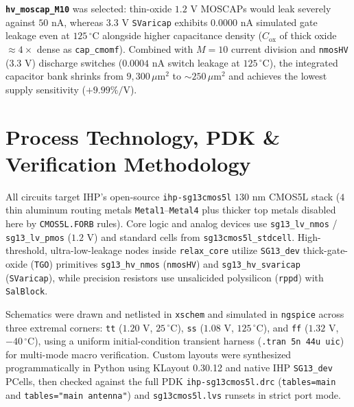 \documentclass[10pt,a4paper]{article}
\begin{document}
\textbf{\texttt{hv\_moscap\_M10}} was selected: thin-oxide $1.2\text{ V}$ MOSCAPs would leak severely against $50\text{ nA}$, whereas $3.3\text{ V}$ \texttt{SVaricap} exhibits $0.0000\text{ nA}$ simulated gate leakage even at $125\,^\circ\text{C}$ alongside higher capacitance density ($C_{\text{ox}}$ of thick oxide $\approx 4\times$ dense as \texttt{cap\_cmomf}). Combined with $M=10$ current division and \texttt{nmosHV} ($3.3\text{ V}$) discharge switches ($0.0004\text{ nA}$ switch leakage at $125\,^\circ\text{C}$), the integrated capacitor bank shrinks from $9{,}300\,\mu\text{m}^2$ to $\sim 250\,\mu\text{m}^2$ and achieves the lowest supply sensitivity ($+9.99\%/\text{V}$).

\section{Process Technology, PDK \& Verification Methodology}

All circuits target IHP's open-source \texttt{ihp-sg13cmos5l} $130\text{ nm}$ CMOS5L stack ($4$ thin aluminum routing metals \texttt{Metal1}--\texttt{Metal4} plus thicker top metals disabled here by \texttt{CMOS5L.FORB} rules). Core logic and analog devices use \texttt{sg13\_lv\_nmos} / \texttt{sg13\_lv\_pmos} ($1.2\text{ V}$) and standard cells from \texttt{sg13cmos5l\_stdcell}. High-threshold, ultra-low-leakage nodes inside \texttt{relax\_core} utilize \texttt{SG13\_dev} thick-gate-oxide (\texttt{TGO}) primitives \texttt{sg13\_hv\_nmos} (\texttt{nmosHV}) and \texttt{sg13\_hv\_svaricap} (\texttt{SVaricap}), while precision resistors use unsalicided polysilicon (\texttt{rppd}) with \texttt{SalBlock}.

Schematics were drawn and netlisted in \texttt{xschem} and simulated in \texttt{ngspice} across three extremal corners: \texttt{tt} ($1.20\text{ V}$, $25\,^\circ\text{C}$), \texttt{ss} ($1.08\text{ V}$, $125\,^\circ\text{C}$), and \texttt{ff} ($1.32\text{ V}$, $-40\,^\circ\text{C}$), using a uniform initial-condition transient harness (\texttt{.tran 5n 44u uic}) for multi-mode macro verification. Custom layouts were synthesized programmatically in Python using KLayout 0.30.12 and native IHP \texttt{SG13\_dev} PCells, then checked against the full PDK \texttt{ihp-sg13cmos5l.drc} (\texttt{tables=main} and \texttt{tables="main antenna"}) and \texttt{sg13cmos5l.lvs} runsets in strict port mode.
\end{document}

